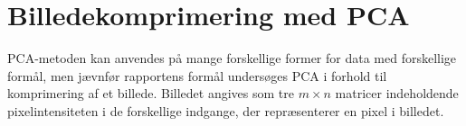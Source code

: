 %


\section{Billedekomprimering med PCA}
PCA-metoden kan anvendes på mange forskellige former for data med forskellige formål, men jævnfør rapportens formål undersøges PCA i forhold til komprimering af et billede. Billedet angives som tre $m \times n$ matricer indeholdende pixelintensiteten i de forskellige indgange, der repræsenterer en pixel i billedet.

